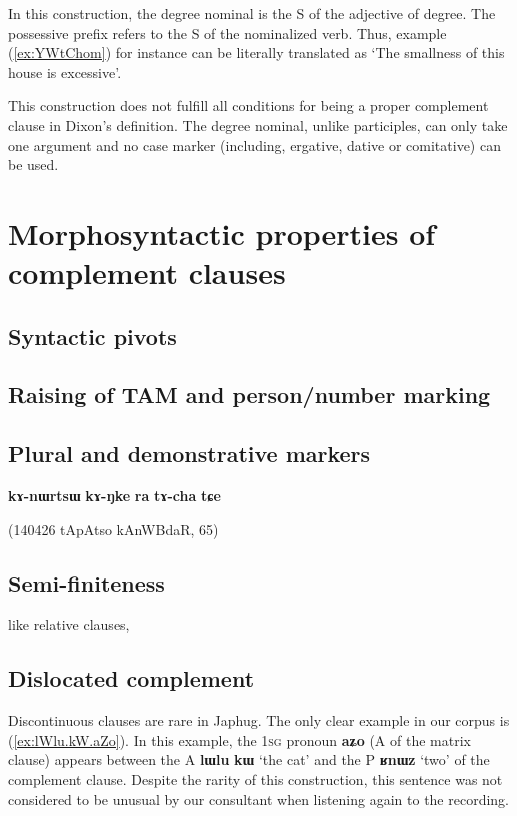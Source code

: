 \documentclass[oldfontcommands,oneside,a4paper,11pt]{article}
\newcommand{\ipa}[1]{\textbf{\phon#1}} %
\begin{document}
In this construction, the degree nominal is the S of the adjective of degree. The possessive prefix refers to the S of the nominalized verb. Thus, example (\ref{ex:YWtChom}) for instance can be literally translated as `The smallness of this house is excessive'. 

This construction does not fulfill all conditions for being a proper complement clause in Dixon's definition. The degree nominal, unlike participles, can only take one argument and no case marker (including, ergative, dative or comitative) can be used.
 
  \section{Morphosyntactic properties of complement clauses} 

 \subsection{Syntactic pivots} 

  \subsection{Raising of TAM and person/number marking} 

 \subsection{Plural and demonstrative markers} 
  \ipa{kɤ-nɯrtsɯ} 	\ipa{kɤ-ŋke} 	\ipa{ra} 	\ipa{tɤ-cha} 	\ipa{tɕe}   
  
  (140426 tApAtso kAnWBdaR, 65)
  \subsection{Semi-finiteness} 
like relative clauses, \citealt{jacques16relatives}

 \subsection{Dislocated complement} 

Discontinuous clauses are rare in Japhug. The only clear example in our corpus is (\ref{ex:lWlu.kW.aZo}). In this example, the \textsc{1sg} pronoun \ipa{aʑo} (A of the matrix clause) appears between the A \ipa{lɯlu} 	\ipa{kɯ} `the cat' and the P \ipa{ʁnɯz} `two' of the complement clause. Despite the rarity of this construction, this sentence was not considered to be unusual by our consultant when listening again to the recording.
 
\end{document}
